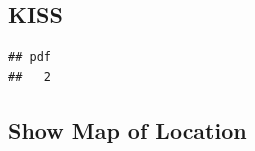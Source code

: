 \documentclass{article}\usepackage[]{graphicx}\usepackage[]{color}
\makeatletter
\newenvironment{kframe}{%
 \def\at@end@of@kframe{}%
 \ifinner\ifhmode%
  \def\at@end@of@kframe{\end{minipage}}%
  \begin{minipage}{\columnwidth}%
 \fi\fi%
 \def\FrameCommand##1{\hskip\@totalleftmargin \hskip-\fboxsep
 \colorbox{shadecolor}{##1}\hskip-\fboxsep
     \hskip-\linewidth \hskip-\@totalleftmargin \hskip\columnwidth}%
 \MakeFramed {\advance\hsize-\width
   \@totalleftmargin\z@ \linewidth\hsize
   \@setminipage}}%
 {\par\unskip\endMakeFramed%
 \at@end@of@kframe}
\newenvironment{knitrout}{}{} %
\makeatother
\begin{document}
\subsection{KISS}

\begin{knitrout}
\color{fgcolor}\begin{kframe}
\begin{verbatim}
## pdf 
##   2
\end{verbatim}
\end{kframe}
\end{knitrout}

\subsection{Show Map of Location}
\end{document}
